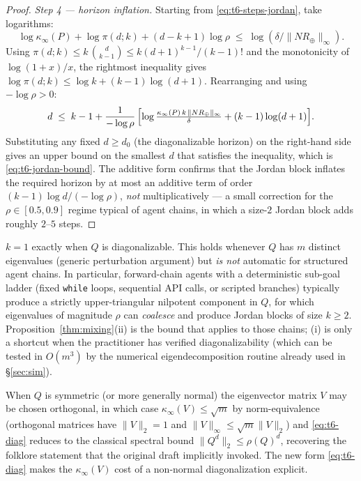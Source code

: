\begin{proof}
\emph{Step 4 --- horizon inflation.}
Starting from \eqref{eq:t6-steps-jordan}, take logarithms:
\[
\log\kappa_\infty(P) + \log\pi(d;k) + (d-k+1)\log\rho
  \;\le\; \log(\delta/\|NR_\oplus\|_\infty).
\]
Using $\pi(d;k)\le k\,\binom{d}{k-1} \le k(d+1)^{k-1}/(k-1)!$ and
the monotonicity of $\log(1+x)/x$, the rightmost inequality gives
$\log\pi(d;k) \le \log k + (k-1)\log(d+1)$. Rearranging and using
$-\log\rho>0$:
\[
d \;\le\; k-1 + \frac{1}{-\log\rho}\,
            \Bigl[\log\tfrac{\kappa_\infty(P)\,k\,\|NR_\oplus\|_\infty}{\delta}
               + (k-1)\log(d+1)\Bigr].
\]
Substituting any fixed $d\ge d_0$ (the diagonalizable horizon) on
the right-hand side gives an upper bound on the smallest $d$ that
satisfies the inequality, which is \eqref{eq:t6-jordan-bound}. The
additive form confirms that the Jordan block inflates the required
horizon by at most an additive term of order $(k-1)\log d/(-\log\rho)$,
\emph{not} multiplicatively --- a small correction for the
$\rho\in[0.5,0.9]$ regime typical of agent chains, in which a size-$2$
Jordan block adds roughly $2$--$5$ steps.
\end{proof}

\begin{remark}[When is $k=1$ guaranteed?]
$k=1$ exactly when $Q$ is diagonalizable. This holds whenever $Q$
has $m$ distinct eigenvalues (generic perturbation argument) but
\emph{is not} automatic for structured agent chains. In particular,
forward-chain agents with a deterministic sub-goal ladder (fixed
\texttt{while} loops, sequential API calls, or scripted
branches) typically produce a strictly upper-triangular nilpotent
component in $Q$, for which eigenvalues of magnitude $\rho$ can
\emph{coalesce} and produce Jordan blocks of size $k\ge 2$.
Proposition~\ref{thm:mixing}(ii) is the bound that applies to those
chains; (i) is only a shortcut when the practitioner has verified
diagonalizability (which can be tested in $O(m^3)$ by the numerical
eigendecomposition routine already used in
\S\ref{sec:sim}).
\end{remark}

\begin{remark}
When $Q$ is symmetric (or more generally normal) the eigenvector
matrix $V$ may be chosen orthogonal, in which case
$\kappa_\infty(V)\le\sqrt{m}$ by norm-equivalence (orthogonal
matrices have $\|V\|_2 = 1$ and $\|V\|_\infty \le \sqrt{m}\|V\|_2$)
and \eqref{eq:t6-diag} reduces to the classical spectral bound
$\|Q^d\|_2 \le \rho(Q)^d$, recovering the folklore statement that
the original draft implicitly invoked. The new form
\eqref{eq:t6-diag} makes the $\kappa_\infty(V)$ cost of a
non-normal diagonalization explicit.
\end{remark}


